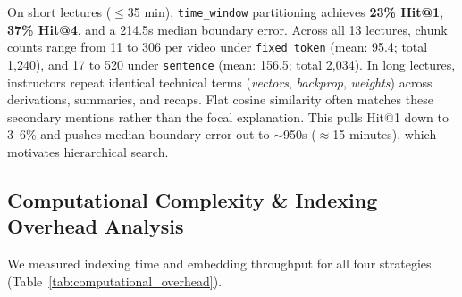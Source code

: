 \documentclass[conference]{IEEEtran}
\begin{document}
\begin{table}[htbp]
\caption{Impact of Video Duration on Temporal Grounding (Search Space Expansion)}
\label{tab:duration_breakdown}
\centering
{}
\end{table}

On short lectures ($\le$35 min), \texttt{time\_window} partitioning achieves \textbf{23\% Hit@1}, \textbf{37\% Hit@4}, and a 214.5s median boundary error. Across all 13 lectures, chunk counts range from 11 to 306 per video under \texttt{fixed\_token} (mean: 95.4; total 1,240), and 17 to 520 under \texttt{sentence} (mean: 156.5; total 2,034). In long lectures, instructors repeat identical technical terms (\textit{vectors}, \textit{backprop}, \textit{weights}) across derivations, summaries, and recaps. Flat cosine similarity often matches these secondary mentions rather than the focal explanation. This pulls Hit@1 down to 3--6\% and pushes median boundary error out to $\sim$950s ($\approx$15 minutes), which motivates hierarchical search.

\subsection{Computational Complexity \& Indexing Overhead Analysis}
\label{sec:computational_overhead}
We measured indexing time and embedding throughput for all four strategies (Table~\ref{tab:computational_overhead}).
\end{document}
